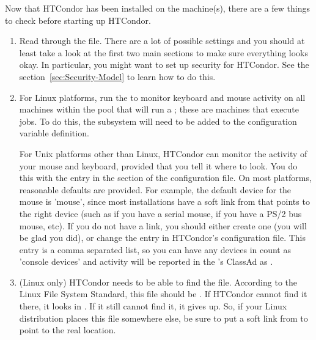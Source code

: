 
Now that HTCondor has been installed on the machine(s), there are a few
things to check before starting up HTCondor.

\begin{enumerate}
\item Read through the  file.  There are a
    lot of possible settings and you should at least take a look at
    the first two main sections to make sure everything looks okay.
    In particular, you might want to set up security for
    HTCondor.  See the section~\ref{sec:Security-Model}
    to learn how to do this.

\item For Linux platforms, run the  to monitor keyboard
    and mouse activity on all machines within the pool that will
    run a ; these are machines that execute jobs.
    To do this, the subsystem  will need to be added to
    the  configuration variable definition.

    For Unix platforms other than Linux,
    HTCondor can monitor the activity of your mouse and keyboard,
    provided that you tell it where to look.  You do this with the
     entry in the  section of
    the configuration file.  On most platforms, reasonable
    defaults are provided.
    For example, the default device for the mouse
    is 'mouse', since most installations have a soft link from
     that points to the right device (such as
     if you have a serial mouse,  if you have
    a PS/2 bus mouse, etc).  If you do not have a 
    link, you should either create one (you will be glad you did), or
    change the  entry in HTCondor's
    configuration file.
    This entry is a comma separated list, so you can have any
    devices in  count as 'console devices' and activity
    will be reported in the 's ClassAd as
    .

\item  (Linux only) HTCondor needs to be able to find the  file.
    According to the Linux File System Standard, this file should be
    .  If HTCondor cannot find it there, it looks in
    .  If it still cannot find it, it gives up.  So, if
    your Linux distribution places this file somewhere else, be sure to
    put a soft link from  to point to the real location.

\end{enumerate}

